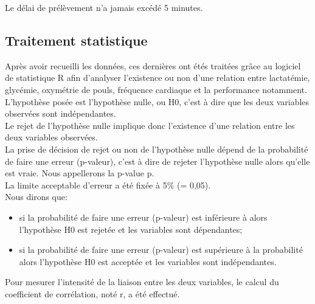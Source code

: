             Le délai de prélèvement n'a jamais excédé 5 minutes.\\
         
            
            \subsection {Traitement statistique}
             
                Après avoir recueilli les données, ces dernières ont étés traitées grâce au logiciel de statistique R afin d'analyser l'existence ou non d'une relation entre lactatémie, glycémie, oxymétrie de pouls, fréquence cardiaque et la performance notamment. \\
                
                L'hypothèse posée est l'hypothèse nulle, ou H0, c'est à dire que les deux variables observées sont indépendantes.\\
                 
                Le rejet de l'hypothèse nulle implique donc l'existence d'une relation entre les deux variables observées.\\
    
                La prise de décision de rejet ou non de l’hypothèse nulle dépend de la probabilité de faire une erreur (p-valeur), c'est à dire de rejeter l'hypothèse nulle alors qu'elle est vraie. Nous appellerons la p-value p.\\
                
                La limite acceptable d'erreur a été fixée à 5\% (\si{\alpha}= 0,05).\\
                
                Nous dirons que:
                  \begin{itemize}
                      \item si la probabilité de faire une erreur (p-valeur) est inférieure à \si{\alpha} alors l'hypothèse H0 est rejetée et les variables sont dépendantes;
                      \item si la probabilité de faire une erreur (p-valeur) est supérieure à la probabilité \si{\alpha} alors l'hypothèse H0 est acceptée et les variables sont indépendantes.\\
                  \end{itemize}
              
                Pour mesurer l'intensité de la liaison entre les deux variables, le calcul du coefficient de corrélation, noté r, a été effectué. \\

